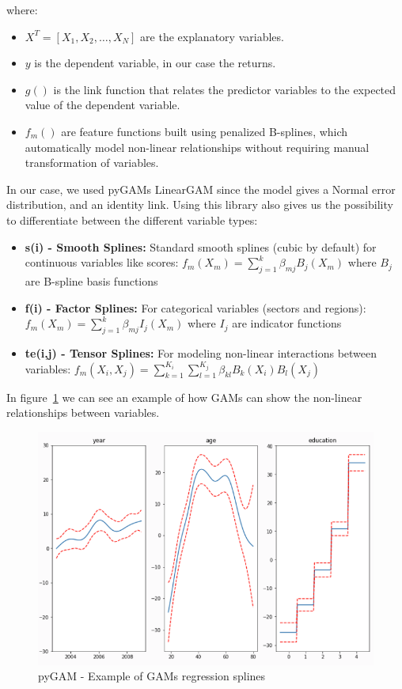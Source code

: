 \documentclass[11pt,english,a4paper,hidelinks]{book}
\begin{document}
\noindent where:
\begin{itemize}
    \item \(X^T = [X_1, X_2, \dots, X_N]\) are the explanatory variables.
    \item \(y\) is the dependent variable, in our case the returns.
    \item \(g()\) is the link function that relates the predictor variables to the expected value of the dependent variable.
    \item \(f_m()\) are feature functions built using penalized B-splines, which automatically model non-linear relationships without requiring manual transformation of variables.
\end{itemize}

\noindent In our case, we used pyGAMs LinearGAM since the model gives a Normal error distribution, and an identity link. Using this library also gives us the possibility to differentiate between the different variable types:

\begin{itemize}
    \item \textbf{s(i) - Smooth Splines:} Standard smooth splines (cubic by default) for continuous variables like scores: \(f_m(X_m) = \sum_{j=1}^{k} \beta_{mj} B_j(X_m)\) where \(B_j\) are B-spline basis functions
    \item \textbf{f(i) - Factor Splines:} For categorical variables (sectors and regions): \(f_m(X_m) = \sum_{j=1}^{k} \beta_{mj} I_j(X_m)\) where \(I_j\) are indicator functions
    \item \textbf{te(i,j) - Tensor Splines:} For modeling non-linear interactions between variables: \(f_m(X_i, X_j) = \sum_{k=1}^{K_i} \sum_{l=1}^{K_j} \beta_{kl} B_k(X_i) B_l(X_j)\)
\end{itemize}

\noindent In figure~\ref{fig:splines_example} we can see an example of how GAMs can show the non-linear relationships between variables.
\begin{figure}[H]
    \centering
    \includegraphics[width=1\textwidth]{images/code/descriptive analysis/gam/splines_example.png}
    \caption{pyGAM - Example of GAMs regression splines}
    \label{fig:splines_example}
\end{figure}
\end{document}
